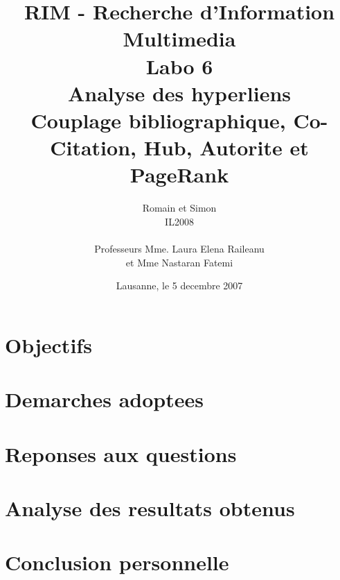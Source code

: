 \documentclass[a4paper, 11pt]{article}
\title{ %
\small{RIM - Recherche d'Information Multimedia} \\ \vspace{2cm}
\huge{Labo 6} \\ \vspace{1cm} 
Analyse des hyperliens\\
\small{Couplage bibliographique, Co-Citation, Hub, Autorite et PageRank}}
\author{Romain \bsc{de Wolff} et Simon \bsc{Hintermann}\\ IL2008 \\ \vspace{2cm} \\ Professeurs Mme. Laura Elena Raileanu \\ et Mme Nastaran Fatemi \vspace{2cm} 
}
\date{Lausanne, le 5 decembre 2007}  %
\begin{document}
\maketitle
\thispagestyle{empty} %
\newpage
 \setcounter{page}{1} 

{\setlength{\baselineskip}{1.2\baselineskip}}
\parskip=12pt
\section{Objectifs} 



\section{Demarches adoptees} 

\section{Reponses aux questions} 

\section{Analyse des resultats obtenus} 

\section{Conclusion personnelle} 


\end{document}
